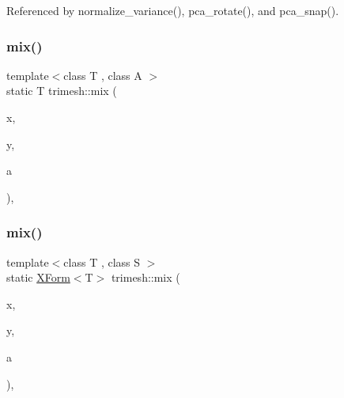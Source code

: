 Referenced by normalize\+\_\+variance(), pca\+\_\+rotate(), and pca\+\_\+snap().

\mbox{\label{namespacetrimesh_afbfc5cc41975c0039611c6da6cc2f35b}} 
\subsubsection{\texorpdfstring{mix()}{mix()}\hspace{0.1cm}{\footnotesize\ttfamily [1/2]}}
{\footnotesize\ttfamily template$<$class T , class A $>$ \\
static T trimesh\+::mix (\begin{DoxyParamCaption}\item[{const T \&}]{x,  }\item[{const T \&}]{y,  }\item[{const A \&}]{a }\end{DoxyParamCaption})\hspace{0.3cm}{\ttfamily [inline]}, {\ttfamily [static]}}

\mbox{\label{namespacetrimesh_ac74eeae44509f66f5bfb47fbd5321706}} 
\subsubsection{\texorpdfstring{mix()}{mix()}\hspace{0.1cm}{\footnotesize\ttfamily [2/2]}}
{\footnotesize\ttfamily template$<$class T , class S $>$ \\
static \hyperlink{classtrimesh_1_1XForm}{X\+Form}$<$T$>$ trimesh\+::mix (\begin{DoxyParamCaption}\item[{const \hyperlink{classtrimesh_1_1XForm}{X\+Form}$<$ T $>$ \&}]{x,  }\item[{const \hyperlink{classtrimesh_1_1XForm}{X\+Form}$<$ T $>$ \&}]{y,  }\item[{const \hyperlink{ego_8cc_abde73cd36321648268fb4543509b996a}{S} \&}]{a }\end{DoxyParamCaption})\hspace{0.3cm}{\ttfamily [inline]}, {\ttfamily [static]}}

\mbox{\label{namespacetrimesh_abed27f847d576c8a6090bc7935114b4c}} 
